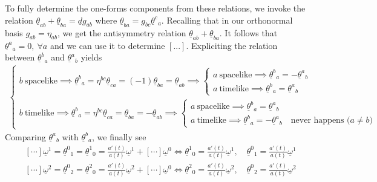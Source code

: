 \documentclass[10pt, a4paper]{article}
\begin{document}
{\begin{enumerate}
  To fully determine the one-forms components from these relations, we invoke the relation $\underline{\theta}_{ab} + \underline{\theta}_{ba} = \underline{d}g_{ab}$ where $\underline{\theta}_{ba} = g_{bc}\underline{\theta}^{c}{}_a$. Recalling that in our orthonormal basis $g_{ab} = \eta_{ab}$, we get the antisymmetry relation $\underline{\theta}_{ab} + \underline{\theta}_{ba}$. It follows that $\underline{\theta}^{a}{}_{a} = 0, \ \forall a$ and we can use it to determine $[...]$. Expliciting the relation between $\underline{\theta}^{b}{}_a$ and  $\underline{\theta}^{a}{}_b$ yields
  \begin{align*}
    \begin{cases}
      b \ \text{spacelike} \implies 
      \underline{\theta}^{b}{}_a = \eta^{bc}\underline{\theta}_{ca} = (-1) \underline{\theta}_{ba} = \underline{\theta}_{ab} \implies 
      \begin{cases}
        a \ \text{spacelike} \implies \underline{\theta}^{b}{}_a = -\underline{\theta}^{a}{}_b\\
        a \ \text{timelike} \implies \underline{\theta}^{b}{}_a =   \underline{\theta}^{a}{}_b
      \end{cases}
        \\
      b \ \text{timelike} \implies 
      \underline{\theta}^{b}{}_a = \eta^{bc}\underline{\theta}_{ca} = \underline{\theta}_{ba} = -\underline{\theta}_{ab}  \implies 
      \begin{cases}
        a \ \text{spacelike} \implies \underline{\theta}^{b}{}_a = \underline{\theta}^{a}{}_b\\
        a \ \text{timelike} \implies \underline{\theta}^{b}{}_a = -\underline{\theta}^{a}{}_b \quad \text{never happens ($a \neq b$)}
      \end{cases}
    \end{cases}
  \end{align*}
  Comparing $\underline{\theta}^{a}{}_b$ with $\underline{\theta}^{b}{}_a$, we finally see 
  \begin{align*}
    &[\cdots] \underline{\omega}^1 = \underline{\theta}^0{ }_{1} = \underline{\theta}^1{ }_{0} = \frac{a'(t)}{a(t)}\underline{\omega}^1 + [\cdots] \underline{\omega}^0 \iff \underline{\theta}^1{ }_{0} = \frac{a'(t)}{a(t)}\underline{\omega}^1, \quad \underline{\theta}^0{ }_{1} = \frac{a'(t)}{a(t)}\underline{\omega}^1\\
    &[\cdots] \underline{\omega}^2 = \underline{\theta}^0{ }_{2} = \underline{\theta}^2{ }_{0} = \frac{a'(t)}{a(t)}\underline{\omega}^2 + [\cdots] \underline{\omega}^0 \iff \underline{\theta}^2{ }_{0} = \frac{a'(t)}{a(t)}\underline{\omega}^2, \quad \underline{\theta}^0{ }_{2} = \frac{a'(t)}{a(t)}\underline{\omega}^2\\

\end{align*}
\end{enumerate}}
\end{document}
